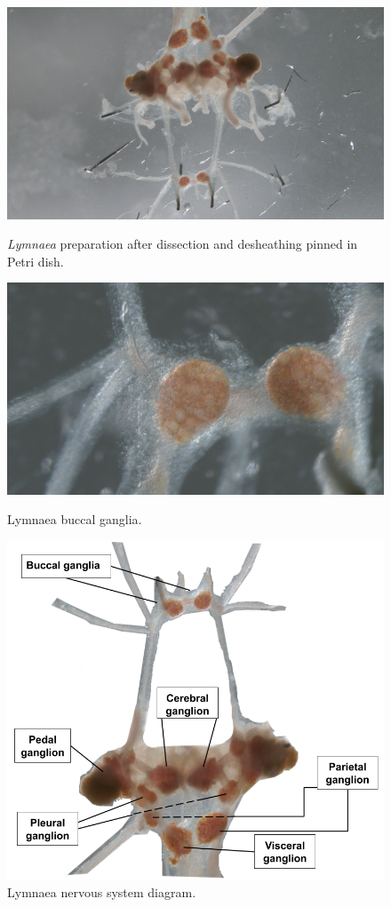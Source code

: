 \begin{figure}[h!]
	\centering
	\includegraphics[angle=180,width=0.9\linewidth]{img/methods/IMG00027.JPG}
	\caption{\textit{Lymnaea} preparation after dissection and desheathing pinned in Petri dish.}
	\label{fig:lymn neural sys}\includegraphics[angle=180,width=0.9\linewidth]{img/methods/preparation/buccal_ganglia.JPG}
	\caption{Lymnaea buccal ganglia.}
	\label{fig:buccal ganglia}
	\endminipage
	\centering
	\includegraphics[width=\linewidth]{img/methods/CNS_diagram.png}
	\caption{Lymnaea nervous system diagram.}
	\label{fig:lymn neural sys diagram}
	\endminipage
\end{figure}


